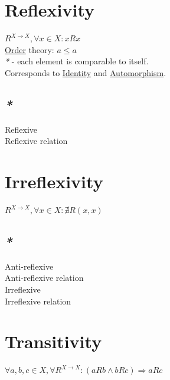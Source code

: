 \documentclass[a4paper,14pt,oneside]{book}
\begin{document}
\section{\label{orgc4f59f8}Reflexivity}
\label{sec:org9611e89}

\(R^{X \to X}, \forall x \in X : x R x\)\\
\hyperref[orgd1a98a3]{Order} theory: \(a \le a\)\\

\emph{*} - each element is comparable to itself.\\

Corresponds to \hyperref[org5e19243]{Identity} and \hyperref[org91243b0]{Automorphism}.\\

\subsection{\emph{*}}
\label{sec:org066fdbb}

\label{org65baa48}Reflexive\\
\label{org1c0676c}Reflexive relation\\

\section{\label{orgfda6204}Irreflexivity}
\label{sec:orga580332}

\(R^{X \to X}, \forall x \in X : \nexists R(x, x)\)\\

\subsection{\emph{*}}
\label{sec:org33146fa}

\label{orgeef84e3}Anti-reflexive\\
\label{org8f90c8d}Anti-reflexive relation\\
\label{org644a55b}Irreflexive\\
\label{org09c8726}Irreflexive relation\\

\section{\label{org76fd351}Transitivity}
\label{sec:org4020cd6}

\(\forall a,b,c \in X, \forall R^{X \to X} : (aRb \land bRc) \Rightarrow aRc\)\\
\end{document}
